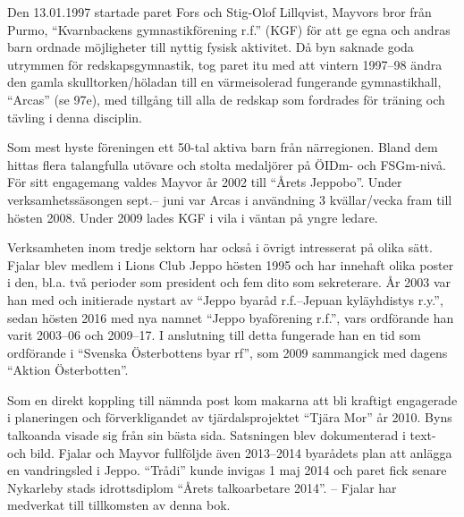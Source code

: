 Den 13.01.1997 startade paret Fors och Stig-Olof Lillqvist, Mayvors	bror från Purmo, ``Kvarnbackens gymnastikförening r.f.'' (KGF) för att ge	egna och andras barn ordnade möjligheter till nyttig fysisk aktivitet. Då byn saknade goda utrymmen för redskapsgymnastik, tog paret itu med att vintern 1997--98 ändra den gamla	skulltorken/höladan till en värmeisolerad fungerande gymnastikhall,	``Arcas'' (se 97e), med tillgång till alla de redskap som fordrades för träning och tävling i denna disciplin.

Som mest hyste föreningen ett 50-tal aktiva barn från närregionen. Bland dem hittas flera talangfulla utövare och stolta medaljörer på ÖIDm- och FSGm-nivå. För sitt engagemang valdes Mayvor år 2002 till ``Årets Jeppobo''. Under verksamhetssäsongen sept.-- juni var Arcas i användning 3 kvällar/vecka fram till hösten 2008. Under 2009 lades KGF i vila i väntan på yngre ledare.

Verksamheten inom tredje sektorn har också i övrigt intresserat på olika sätt. Fjalar blev medlem i Lions Club Jeppo hösten 1995 och har innehaft olika poster i den, bl.a. två perioder som president och fem dito som sekreterare. År 2003 var han med och initierade	nystart av ``Jeppo byaråd r.f.--Jepuan kyläyhdistys r.y.'', sedan hösten 2016 med nya namnet ``Jeppo byaförening r.f.'', vars ordförande han varit 2003--06 och 2009--17. I anslutning till detta fungerade han en tid som ordförande i ``Svenska Österbottens byar rf'', som 2009 sammangick med dagens ``Aktion Österbotten''.

Som en direkt koppling till nämnda post kom makarna att bli kraftigt engagerade i planeringen och förverkligandet av tjärdalsprojektet ``Tjära Mor'' år 2010. Byns talkoanda visade sig från sin bästa sida.  Satsningen blev dokumenterad i text- och bild. Fjalar och Mayvor fullföljde även 2013--2014 byarådets plan att anlägga en vandringsled i Jeppo. ``Trådi'' kunde invigas 1 maj 2014 och paret fick senare Nykarleby stads idrottsdiplom ``Årets talkoarbetare 2014''. -- Fjalar har medverkat till tillkomsten av denna bok.



%



